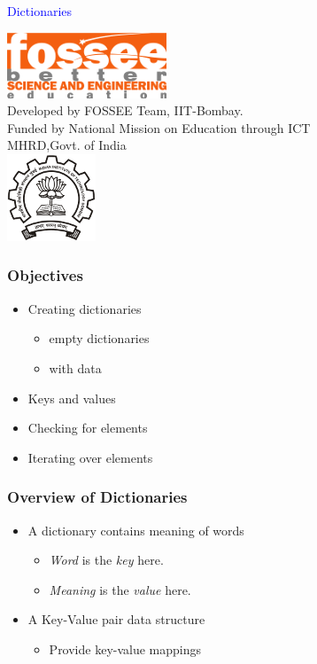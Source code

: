 \documentclass[presentation]{beamer}
\title{}
\author{FOSSEE}
\date{}
\begin{document}
\begin{frame}

\begin{center}
\vspace{12pt}
\textcolor{blue}{\huge Dictionaries}
\end{center}
\vspace{18pt}
\begin{center}
\vspace{10pt}
\includegraphics[scale=0.95]{../images/fossee-logo.png}\\
\vspace{5pt}
\scriptsize Developed by FOSSEE Team, IIT-Bombay. \\ 
\scriptsize Funded by National Mission on Education through ICT\\
\scriptsize  MHRD,Govt. of India\\
\includegraphics[scale=0.30]{../images/iitb-logo.png}\\
\end{center}
\end{frame}
\begin{frame}
\frametitle{Objectives}
\label{sec-2}


\begin{itemize}
\item Creating dictionaries
\begin{itemize}
\item empty dictionaries
\item with data
\end{itemize}
\item Keys and values
\item Checking for elements
\item Iterating over elements
\end{itemize}
\end{frame}
\begin{frame}
\frametitle{Overview of Dictionaries}
\label{sec-3}


\begin{itemize}
\item A dictionary contains meaning of words
\begin{itemize}
\item \emph{Word} is the \emph{key} here.
\item \emph{Meaning} is the \emph{value} here.
\end{itemize}
\item A Key-Value pair data structure
\begin{itemize}
\item Provide key-value mappings
\end{itemize}
\end{itemize}
\end{frame}
\end{document}

